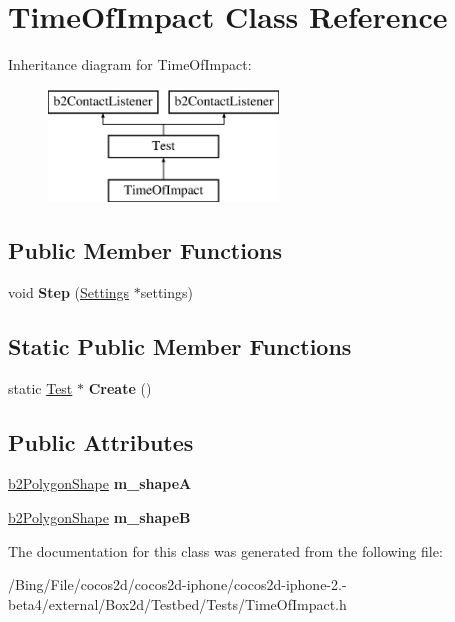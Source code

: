 \hypertarget{class_time_of_impact}{\section{Time\-Of\-Impact Class Reference}
\label{class_time_of_impact}
}
Inheritance diagram for Time\-Of\-Impact\-:\begin{figure}[H]
\begin{center}
\leavevmode
\includegraphics[height=3.000000cm]{class_time_of_impact}
\end{center}
\end{figure}
\subsection*{Public Member Functions}
\begin{DoxyCompactItemize}
\item 
\hypertarget{class_time_of_impact_aa418bdd43d937a9f22600614cfb62ed8}{void {\bfseries Step} (\hyperlink{struct_settings}{Settings} $\ast$settings)}\label{class_time_of_impact_aa418bdd43d937a9f22600614cfb62ed8}

\end{DoxyCompactItemize}
\subsection*{Static Public Member Functions}
\begin{DoxyCompactItemize}
\item 
\hypertarget{class_time_of_impact_ae7144aa9a01d2d323e319286becffd69}{static \hyperlink{class_test}{Test} $\ast$ {\bfseries Create} ()}\label{class_time_of_impact_ae7144aa9a01d2d323e319286becffd69}

\end{DoxyCompactItemize}
\subsection*{Public Attributes}
\begin{DoxyCompactItemize}
\item 
\hypertarget{class_time_of_impact_aaf646ad647d0dc6f006b12beacbddb97}{\hyperlink{classb2_polygon_shape}{b2\-Polygon\-Shape} {\bfseries m\-\_\-shape\-A}}\label{class_time_of_impact_aaf646ad647d0dc6f006b12beacbddb97}

\item 
\hypertarget{class_time_of_impact_a370c8e6e42c3ea36baffa9669b54f8eb}{\hyperlink{classb2_polygon_shape}{b2\-Polygon\-Shape} {\bfseries m\-\_\-shape\-B}}\label{class_time_of_impact_a370c8e6e42c3ea36baffa9669b54f8eb}

\end{DoxyCompactItemize}


The documentation for this class was generated from the following file\-:\begin{DoxyCompactItemize}
\item 
/\-Bing/\-File/cocos2d/cocos2d-\/iphone/cocos2d-\/iphone-\/2.-\/beta4/external/\-Box2d/\-Testbed/\-Tests/Time\-Of\-Impact.\-h\end{DoxyCompactItemize}
